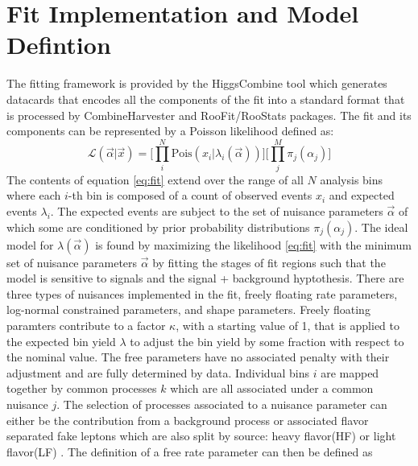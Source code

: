 




\section{Fit Implementation and Model Defintion}
The fitting framework is provided by the HiggsCombine tool which generates datacards that encodes all the components of the fit into a standard format that is processed by CombineHarvester and RooFit/RooStats packages. The fit and its components can be represented by a Poisson likelihood defined as:
\begin{equation}
\label{eq:fit}
\mathcal{L}(\vec{\alpha}|\vec{x}) = \bigg[ \prod_i^N \text{Pois}(x_i|\lambda_i(\vec{\alpha})) \bigg] \bigg[\prod_j^M \pi_j(\alpha_j) \bigg]
\end{equation}
The contents of equation \ref{eq:fit} extend over the range of all $N$ analysis bins where each $i$-th bin is composed of a count of observed events $x_i$ and expected events $\lambda_i$. The expected events are subject to the set of nuisance parameters $\vec{\alpha}$ of which some are conditioned by prior probability distributions $\pi_j(\alpha_j)$. The ideal model for $\lambda(\vec{\alpha})$ is found by maximizing the likelihood \ref{eq:fit} with the minimum set of nuisance parameters $\vec{\alpha}$ by fitting the stages of fit regions such that the model is sensitive to signals and the signal + background hyptothesis.  There are three types of nuisances implemented in the fit, freely floating rate parameters, log-normal constrained parameters, and shape parameters.  Freely floating paramters contribute to a factor $\kappa$, with a starting value of 1,  that is applied to the expected bin yield $\lambda$ to adjust the bin yield by some fraction with respect to the nominal value. The free parameters have no associated penalty with their adjustment and are fully determined by data. Individual bins $i$ are mapped together by common processes $k$ which are all associated under a common nuisance $j$. The selection of processes associated to a nuisance parameter can either be the contribution from a background process or associated flavor separated fake leptons which are also split by source: heavy flavor(HF) or light flavor(LF) . The definition of a free rate parameter can then be defined as 
